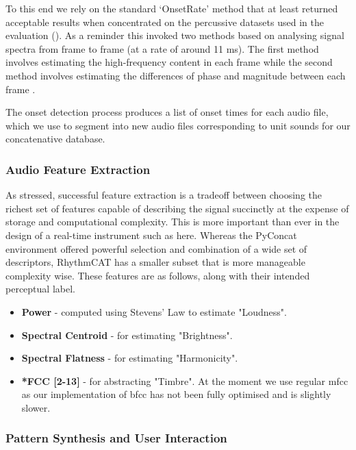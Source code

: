 To this end we rely on the standard `OnsetRate' method that at least returned acceptable results when concentrated on the percussive datasets used in the evaluation (). As a reminder this invoked two methods based on analysing signal spectra from frame to frame (at a rate of around 11 ms). The first method involves estimating the high-frequency content in each frame \citep{Masri1996} while the second method involves estimating the differences of phase and magnitude between each frame \citep{Bello2005}.

The onset detection process produces a list of onset times for each audio file, which we use to segment into new audio files corresponding to unit sounds for our concatenative database.

\subsubsection{Audio Feature Extraction}

As stressed, successful feature extraction is a tradeoff between choosing the richest set of features capable of describing the signal succinctly at the expense of storage and computational complexity. This is more important than ever in the design of a real-time instrument such as here. Whereas the PyConcat environment offered powerful selection and combination of a wide set of descriptors, RhythmCAT has a smaller subset that is more manageable complexity wise. These features are as follows, along with their intended perceptual label.
 
 \begin{itemize}
  \item \textbf{Power} - computed using Stevens' Law to estimate "Loudness".
  \item \textbf{Spectral Centroid} - for estimating "Brightness".
  \item \textbf{Spectral Flatness} - for estimating "Harmonicity".
  \item \textbf{*FCC [2-13]} - for abstracting "Timbre". At the moment we use regular \acrshort{mfcc} as our implementation of \acrshort{bfcc} has not been fully optimised and is slightly slower.
\end{itemize}

\subsubsection{Pattern Synthesis and User Interaction}


